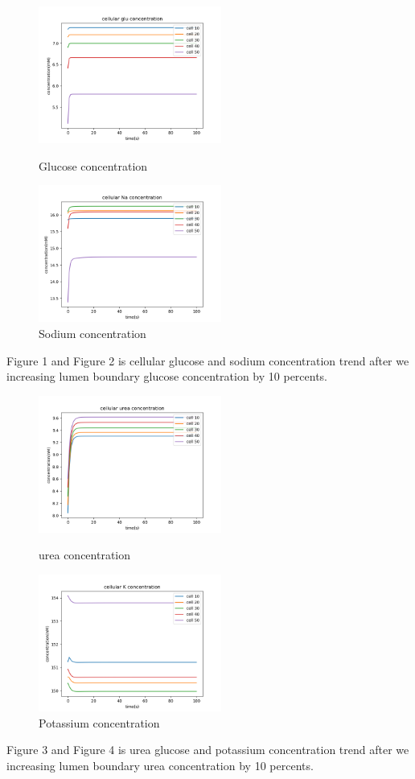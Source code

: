 \documentclass{article}
\begin{document}
\begin{figure}[H]
\centering
\begin{minipage}[t]{0.48\textwidth}
\centering
\includegraphics[width=6cm]{figure/figure1.png}
\caption{Glucose concentration}
\end{minipage}
\begin{minipage}[t]{0.48\textwidth}
\centering
\includegraphics[width=6cm]{figure/figure2.png}
\caption{Sodium concentration}
\end{minipage}
\end{figure}

Figure 1 and Figure 2 is cellular glucose and sodium concentration trend after we increasing lumen boundary glucose concentration by 10 percents.

\begin{figure}[H]
\centering
\begin{minipage}[t]{0.48\textwidth}
\centering
\includegraphics[width=6cm]{figure/figure3.png}
\caption{urea concentration}
\end{minipage}
\begin{minipage}[t]{0.48\textwidth}
\centering
\includegraphics[width=6cm]{figure/figure4.png}
\caption{Potassium concentration}
\end{minipage}
\end{figure}
Figure 3 and Figure 4 is urea glucose and potassium concentration trend after we increasing lumen boundary urea concentration by 10 percents.
\end{document}

